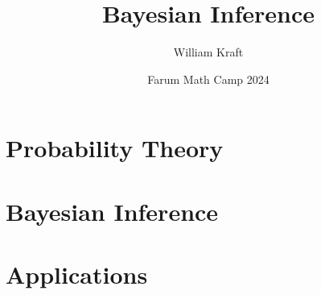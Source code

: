 \documentclass[a4paper]{article}
\title{Bayesian Inference}
\author{William Kraft}
\date{Farum Math Camp 2024}
\theoremstyle{definition}
\theoremstyle{definition}
\theoremstyle{definition}
\theoremstyle{definition}
\theoremstyle{definition}
\theoremstyle{definition}
\theoremstyle{definition}
\theoremstyle{definition}
\theoremstyle{definition}
\theoremstyle{definition}
\theoremstyle{definition}
\theoremstyle{definition}
\theoremstyle{plain}
\begin{document}
\maketitle
\tableofcontents


\newpage
\section{Probability Theory}

\newpage
\section{Bayesian Inference}

\newpage
\section{Applications}


\end{document}
